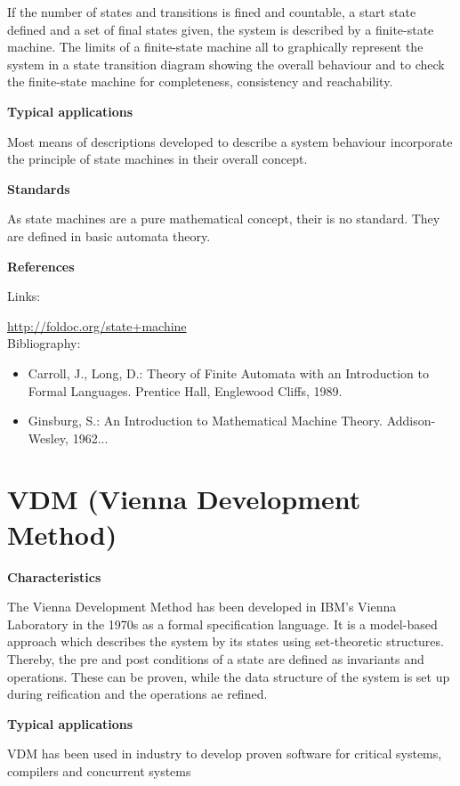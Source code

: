 \documentclass{./template/openetcs_report}
\begin{document}
If the number of states and transitions is fined and countable, a start state defined and a set of final states given, the system is described by a finite-state machine. The limits of a finite-state machine all to graphically represent the system in a state transition diagram showing the overall behaviour and to check the finite-state machine for completeness, consistency and reachability.

	\textbf{Typical applications}

Most means of descriptions developed to describe a system behaviour incorporate the principle of state machines in their overall concept.

	\textbf{Standards}

As state machines are a pure mathematical concept, their is no standard. They are defined in basic automata theory.

	\textbf{References}

Links:

\url{http://foldoc.org/state+machine} \\[4pt]

Bibliography:

\begin{itemize}
\item Carroll, J., Long, D.: Theory of Finite Automata with an Introduction to Formal Languages. Prentice Hall, Englewood Cliffs, 1989.
\item Ginsburg, S.: An Introduction to Mathematical Machine Theory. Addison-Wesley, 1962...
\end{itemize}


\section{VDM (Vienna Development Method)}


	\textbf{Characteristics}

The Vienna Development Method has been developed in IBM's Vienna Laboratory in the 1970s as a formal specification language. It is a model-based approach which describes the system by its states using set-theoretic structures. Thereby, the pre and post conditions of a state are defined as invariants and operations. These can be proven, while the data structure of the system is set up during reification and the operations ae refined.
 
	\textbf{Typical applications}

VDM has been used in industry to develop proven software for critical systems, compilers and concurrent systems
\end{document}
